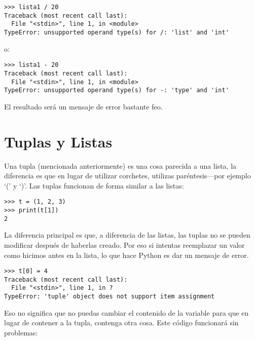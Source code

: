 \begin{listing}
\begin{verbatim}
>>> lista1 / 20
Traceback (most recent call last):
  File "<stdin>", line 1, in <module>
TypeError: unsupported operand type(s) for /: 'list' and 'int'
\end{verbatim}
\end{listing}

\noindent
o:

\begin{listing}
\begin{verbatim}
>>> lista1 - 20
Traceback (most recent call last):
  File "<stdin>", line 1, in <module>
TypeError: unsupported operand type(s) for -: 'type' and 'int'
\end{verbatim}
\end{listing}

\noindent
El resultado será un mensaje de error bastante feo.

\section{Tuplas y Listas}\label{tuplesandlists}

Una tupla (mencionada anteriormente) es una cosa parecida a una lista, la diferencia es que en lugar de utilizar corchetes, utilizas paréntesis---por ejemplo `(' y `)'. Las tuplas funcionan de forma similar a las listas:

\begin{listing}
\begin{verbatim}
>>> t = (1, 2, 3)
>>> print(t[1])
2
\end{verbatim}
\end{listing}

La diferencia principal es que, a diferencia de las listas, las tuplas no se pueden modificar después de haberlas creado. Por eso si intentas reemplazar un valor como hicimos antes en la lista, lo que hace Python es dar un mensaje de error.

\begin{listing}
\begin{verbatim}
>>> t[0] = 4
Traceback (most recent call last):
  File "<stdin>", line 1, in ?
TypeError: 'tuple' object does not support item assignment
\end{verbatim}
\end{listing}

Eso no significa que no puedas cambiar el contenido de la variable para que en lugar de contener a la tupla, contenga otra cosa. Este código funcionará sin problemas:

